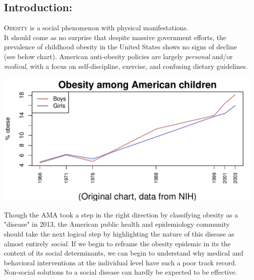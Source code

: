 \begin{multicols}{2} %

\section*{Introduction: }

\lettrine[nindent=0em,lines=3]{O}{besity} is a social phenomenon with physical manifestations. \\

It should come as no surprise that despite massive government efforts, the prevalence of childhood obesity in the United States shows no signs of decline \cite{Ogden2014} (see below chart).  American anti-obesity policies are largely \emph{personal} and/or \emph{medical}, with a focus on self-discipline, exercise, and confusing dietary guidelines.  \\

\begin{knitrout}
\color{fgcolor}

{\centering \includegraphics[width=\maxwidth]{figure/fig-plot1} 

}



\end{knitrout}
\cite{NIH}

Though the AMA took a step in the right direction by classifying obesity as a "disease" in 2013, %
the American public health and epidemiology community should take the next logical step by highlighting the nature of this disease as almost entirely \emph{social}.  If we begin to reframe the obesity epidemic in its the context of its social determinants, we can begin to understand why medical and behavioral interventions at the individual level have such a poor track record. Non-social solutions to a social disease can hardly be expected to be effective. \\


\end{multicols}
